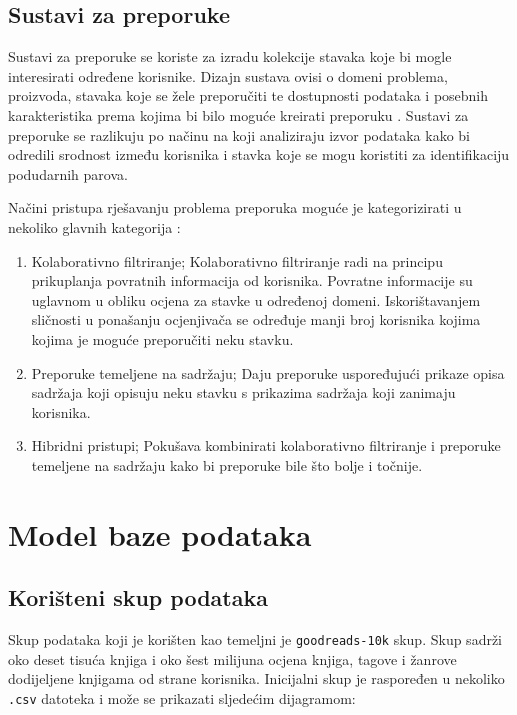\documentclass[]{foi}
\begin{document}
\section{Sustavi za preporuke}

Sustavi za preporuke se koriste za izradu kolekcije stavaka koje bi mogle interesirati određene korisnike.
Dizajn sustava ovisi o domeni problema, proizvoda, stavaka koje se žele preporučiti te dostupnosti podataka i posebnih
karakteristika prema kojima bi bilo moguće kreirati preporuku \cite{melville2010recommender}.
Sustavi za preporuke se razlikuju po načinu na koji analiziraju izvor podataka kako bi odredili
srodnost između korisnika i stavka koje se mogu koristiti za identifikaciju podudarnih parova.

Načini pristupa rješavanju problema preporuka moguće je kategorizirati u nekoliko glavnih kategorija \cite{lu2012recommender}:
\begin{enumerate}
	\item Kolaborativno filtriranje; Kolaborativno filtriranje radi na principu prikuplanja povratnih informacija od korisnika.
	      Povratne informacije su uglavnom u obliku ocjena za stavke u određenoj domeni. Iskorištavanjem sličnosti u ponašanju
	      ocjenjivača se određuje manji broj korisnika kojima kojima je moguće preporučiti neku stavku.
	\item Preporuke temeljene na sadržaju; Daju preporuke uspoređujući prikaze opisa sadržaja koji opisuju neku stavku s
	      prikazima sadržaja koji zanimaju korisnika.
	\item Hibridni pristupi; Pokušava kombinirati kolaborativno filtriranje i preporuke temeljene na sadržaju kako bi
	      preporuke bile što bolje i točnije.
\end{enumerate}

\chapter{Model baze podataka} \label{cha:model_baze_podataka}

\section{Korišteni skup podataka}

Skup podataka koji je korišten kao temeljni je \texttt{goodreads-10k} skup. Skup sadrži oko deset tisuća knjiga i oko šest milijuna ocjena
knjiga, tagove i žanrove dodijeljene knjigama od strane korisnika. Inicijalni skup je raspoređen u nekoliko \texttt{.csv} datoteka i može
se prikazati sljedećim dijagramom:
\end{document}

